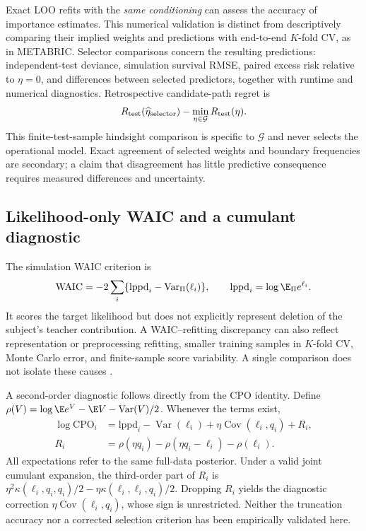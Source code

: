 \documentclass{article} %
\begin{document}
Exact LOO refits with the \emph{same conditioning} can assess the accuracy of importance estimates. This numerical validation is distinct from descriptively comparing their implied weights and predictions with end-to-end $K$-fold CV, as in METABRIC. Selector comparisons concern the resulting predictions: independent-test deviance, simulation survival RMSE, paired excess risk relative to $\eta=0$, and differences between selected predictors, together with runtime and numerical diagnostics. Retrospective candidate-path regret is
\[
R_{\rm test}(\widehat\eta_{\rm selector})-\min_{\eta\in\mathcal G}R_{\rm test}(\eta).
\]
This finite-test-sample hindsight comparison is specific to $\mathcal G$ and never selects the operational model. Exact agreement of selected weights and boundary frequencies are secondary; a claim that disagreement has little predictive consequence requires measured differences and uncertainty.

\subsection{Likelihood-only WAIC and a cumulant diagnostic}
The simulation WAIC criterion is
\begin{equation}
\operatorname{WAIC}=-2\sum_i\{\mathrm{lppd}_i-\operatorname{Var}_\Pi(\ell_i)\},
\qquad\mathrm{lppd}_i=\log\E_\Pi e^{\ell_i}.
\label{eq:waic-main}
\end{equation}
It scores the target likelihood but does not explicitly represent deletion of the subject's teacher contribution. A WAIC--refitting discrepancy can also reflect representation or preprocessing refitting, smaller training samples in $K$-fold CV, Monte Carlo error, and finite-sample score variability. A single comparison does not isolate these causes \citep{vehtari2017loo}.

A second-order diagnostic follows directly from the CPO identity. Define $\rho(V)=\log\E e^V-\E V-\operatorname{Var}(V)/2$. Whenever the terms exist,
\begin{align}
\log\mathrm{CPO}_i
&=\mathrm{lppd}_i-\operatorname{Var}(\ell_i)+\eta\operatorname{Cov}(\ell_i,q_i)+R_i,\label{eq:cpo-cumulant}\\
R_i&=\rho(\eta q_i)-\rho(\eta q_i-\ell_i)-\rho(\ell_i).\nonumber
\end{align}
All expectations refer to the same full-data posterior. Under a valid joint cumulant expansion, the third-order part of $R_i$ is $\eta^2\kappa(\ell_i,q_i,q_i)/2-\eta\kappa(\ell_i,\ell_i,q_i)/2$. Dropping $R_i$ yields the diagnostic correction $\eta\operatorname{Cov}(\ell_i,q_i)$, whose sign is unrestricted. Neither the truncation accuracy nor a corrected selection criterion has been empirically validated here.
\end{document}
